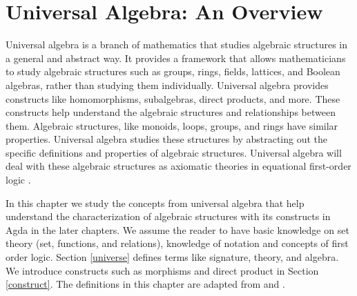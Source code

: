\chapter{Universal Algebra: An Overview}
\label{start}
Universal algebra is a branch of mathematics that studies algebraic structures
in a general and abstract way. It provides a framework that allows
mathematicians to study algebraic structures such as groups, rings, fields,
lattices, and Boolean algebras, rather than studying them individually.
Universal algebra provides constructs like homomorphisms, subalgebras, direct
products, and more. These constructs help understand the algebraic structures
and relationships between them. Algebraic structures, like monoids, loops,
groups, and rings have similar properties. Universal algebra studies these
structures by abstracting out the specific definitions and properties of
algebraic structures. Universal algebra will deal with these algebraic
structures as axiomatic theories in equational first-order logic
\cite{YSharoda}. 

In this chapter we study the concepts from universal algebra that help
understand the characterization of algebraic structures with its constructs in
Agda in the later chapters. We assume the reader to have basic knowledge on set
theory (set, functions, and relations), knowledge of notation and concepts of
first order logic. Section \ref{universe} defines terms like signature, theory,
and algebra. We introduce constructs such as morphisms and direct product in
Section \ref{construct}. The definitions in this chapter are adapted from
\cite{sankappanavar1981course} and \cite{sannella2012foundations}. 

